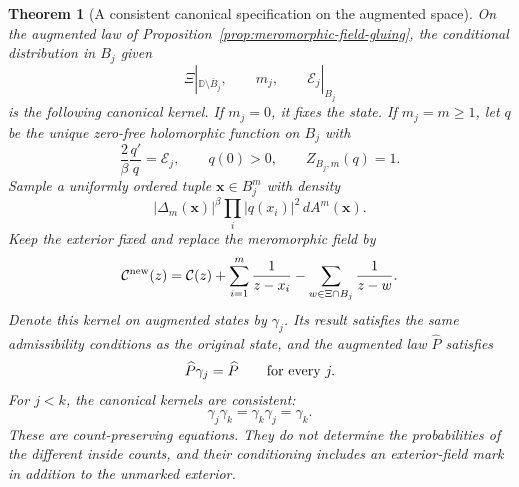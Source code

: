 \documentclass[11pt,a4paper]{article}
\numberwithin{equation}{section}
\newtheorem{theorem}{Theorem}[section]
\theoremstyle{definition}
\theoremstyle{remark}
\newcommand{\D}{\mathbb D}
\begin{document}
\begin{theorem}[A consistent canonical specification on the augmented space]
\label{thm:consistent-augmented-canonical-specification}
On the augmented law of Proposition~\ref{prop:meromorphic-field-gluing},
the conditional distribution in $B_j$ given
\[
 \Xi|_{\D\setminus\overline B_j},\qquad m_j,\qquad
                         \mathcal E_j|_{B_j}
\]
is the following canonical kernel. If $m_j=0$, it fixes the state. If
$m_j=m\ge1$, let $q$ be the unique zero-free holomorphic function on
$B_j$ with
\[
 \frac2\beta\frac{q'}q=\mathcal E_j,
       \qquad q(0)>0,\qquad Z_{B_j,m}(q)=1.
\]
Sample a uniformly ordered tuple $\mathbf x\in B_j^m$ with density
\begin{equation}\label{eq:consistent-augmented-kernel}
 |\Delta_m(\mathbf x)|^\beta\prod_i|q(x_i)|^2\,dA^m(\mathbf x).
\end{equation}
Keep the exterior fixed and replace the meromorphic field by
\begin{equation}\label{eq:augmented-field-resampling-update}
 \mathcal C^{\rm new}(z)=\mathcal C(z)
       +\sum_{i=1}^m\frac1{z-x_i}
       -\sum_{w\in\Xi\cap B_j}\frac1{z-w}.
\end{equation}
Denote this kernel on augmented states by $\gamma_j$. Its result
satisfies the same admissibility conditions as the original state,
and the augmented law $\widehat P$ satisfies
\[
 \widehat P\gamma_j=\widehat P\qquad\hbox{for every }j.
\]
For $j<k$, the canonical kernels are consistent:
\begin{equation}\label{eq:augmented-canonical-consistency}
 \gamma_j\gamma_k=\gamma_k\gamma_j=\gamma_k.
\end{equation}
These are count-preserving equations. They do not determine the
probabilities of the different inside counts, and their conditioning
includes an exterior-field mark in addition to the unmarked exterior.
\end{theorem}
\end{document}
